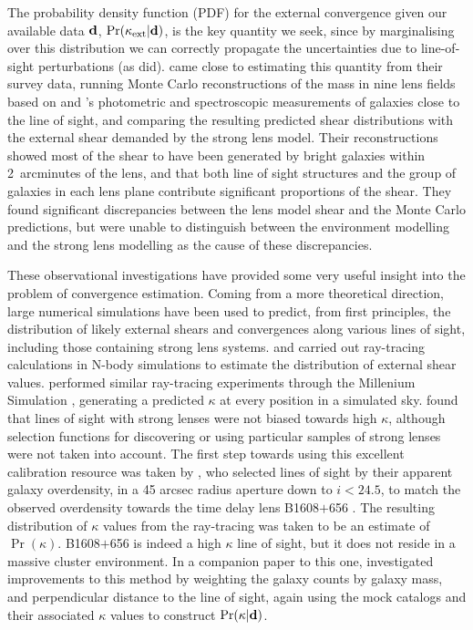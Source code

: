 \documentclass[useAMS,usenatbib]{mn2e}
\begin{document}
The probability density function (PDF) for the external convergence
given our available data ${\mathbf{d}}$, ${\rm Pr}(\kappa_{\rm ext}|{\mathbf{d}})$,  is the  key
quantity we seek, since by marginalising over this distribution we can
correctly propagate the uncertainties due to line-of-sight perturbations
(as \citeauthor{FadelyEtal2009} did).
\citet{WongEtal2011} came close to estimating this quantity from their
survey data, running Monte Carlo reconstructions of the mass in nine
lens fields based on \citeauthor{WilliamsEtal2006} and
\citeauthor{MomchevaEtal2006}'s photometric and spectroscopic
measurements of galaxies close to the line of sight, and comparing the
resulting predicted shear distributions with the external shear demanded
by the strong lens model. Their reconstructions showed most of the shear
to have been generated by bright galaxies within 2~arcminutes of the
lens, and that both line of sight structures and the group of galaxies
in each lens plane contribute significant proportions of the shear. They
found significant discrepancies between the lens model shear and the
Monte Carlo predictions, but were unable to distinguish between the
environment modelling and the strong lens modelling as the cause of
these discrepancies.

These observational investigations have provided some very useful
insight into the problem of convergence estimation.  Coming from a more
theoretical direction, large numerical simulations have been used to
predict, from first principles, the distribution of likely external
shears and convergences along various lines of sight, including those
containing strong lens systems.  \citet{Holder+Schechter2003} and
\citet{DalalEtal2005} carried out ray-tracing calculations in N-body
simulations to estimate the distribution of external shear values. 
\citet{HilbertEtal2009} performed similar ray-tracing experiments
through the Millenium Simulation \citep{SpringelEtal2005}, generating a
predicted $\kappa$ at every position in a simulated sky.
\citet{HilbertEtal2009} found that \MS lines of sight with strong lenses
were not biased towards high $\kappa$, although selection functions for
discovering or using particular samples of strong lenses were not taken
into account. The first step towards using this excellent calibration
resource was taken by \citet{SuyuEtal2010}, who selected \MS lines of
sight by their apparent galaxy overdensity, in a 45 arcsec radius
aperture down to $i < 24.5$, to match the observed overdensity towards
the time delay lens B1608$+$656 \citep{FassnachtEtal2011}. The resulting
distribution of $\kappa$ values from the ray-tracing was taken to be an
estimate of  $\Pr(\kappa)$. B1608$+$656 is indeed a high $\kappa$ line
of sight, but it does not reside in a massive cluster environment. In a
companion paper to this one, \citet{GreeneEtal2012} investigated
improvements to this method by weighting the galaxy counts by galaxy
mass, and perpendicular distance to the line of sight, again using the
\MS mock catalogs and their associated $\kappa$ values to construct
${\rm Pr}(\kappa|{\mathbf{d}})$.
\end{document}
